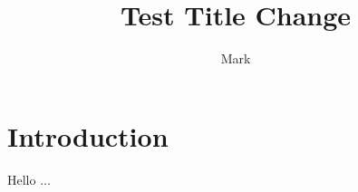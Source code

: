 \documentclass{article}
\title{Test Title Change}
\author{Mark}
\begin{document}
\maketitle

\section{Introduction}
Hello ...
\end{document}
